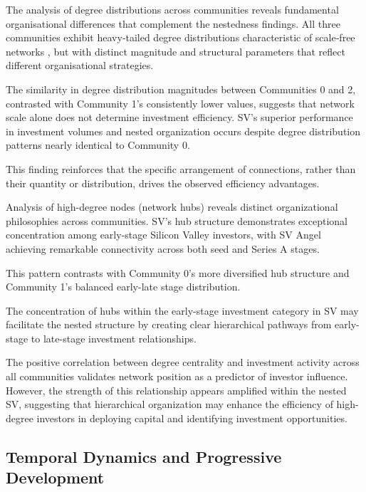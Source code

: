 The analysis of degree distributions across communities reveals fundamental organisational differences that complement the nestedness findings.  All three communities exhibit heavy‑tailed degree distributions characteristic of scale‑free networks \cite{Barabasi1999,Borgatti2009}, but with distinct magnitude and structural parameters that reflect different organisational strategies.

The similarity in degree distribution magnitudes between Communities 0 and 2, contrasted with Community 1's consistently lower values, suggests that network scale alone does not determine investment efficiency. SV's superior performance in investment volumes and nested organization occurs despite degree distribution patterns nearly identical to Community 0. 

This finding reinforces that the specific arrangement of connections, rather than their quantity or distribution, drives the observed efficiency advantages.

Analysis of high-degree nodes (network hubs) reveals distinct organizational philosophies across communities. SV's hub structure demonstrates exceptional concentration among early-stage Silicon Valley investors, with SV Angel achieving remarkable connectivity across both seed and Series A stages. 

This pattern contrasts with Community 0's more diversified hub structure and Community 1's balanced early-late stage distribution. 

The concentration of hubs within the early-stage investment category in SV may facilitate the nested structure by creating clear hierarchical pathways from early-stage to late-stage investment relationships.

The positive correlation between degree centrality and investment activity across all communities validates network position as a predictor of investor influence. However, the strength of this relationship appears amplified within the nested SV, suggesting that hierarchical organization may enhance the efficiency of high-degree investors in deploying capital and identifying investment opportunities.

\subsection{Temporal Dynamics and Progressive Development}


